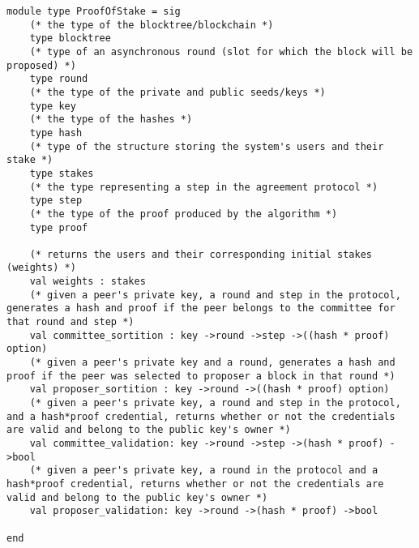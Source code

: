 \begin{lstlisting}
module type ProofOfStake = sig
    (* the type of the blocktree/blockchain *)
    type blocktree
    (* type of an asynchronous round (slot for which the block will be proposed) *)
    type round
    (* the type of the private and public seeds/keys *)
    type key
    (* the type of the hashes *)
    type hash
    (* type of the structure storing the system's users and their stake *)
    type stakes
    (* the type representing a step in the agreement protocol *)
    type step
    (* the type of the proof produced by the algorithm *)
    type proof
  
    (* returns the users and their corresponding initial stakes (weights) *)
    val weights : stakes
    (* given a peer's private key, a round and step in the protocol, generates a hash and proof if the peer belongs to the committee for that round and step *)
    val committee_sortition : key ->round ->step ->((hash * proof) option)
    (* given a peer's private key and a round, generates a hash and proof if the peer was selected to proposer a block in that round *)
    val proposer_sortition : key ->round ->((hash * proof) option)
    (* given a peer's private key, a round and step in the protocol, and a hash*proof credential, returns whether or not the credentials are valid and belong to the public key's owner *)
    val committee_validation: key ->round ->step ->(hash * proof) ->bool
    (* given a peer's private key, a round in the protocol and a hash*proof credential, returns whether or not the credentials are valid and belong to the public key's owner *)
    val proposer_validation: key ->round ->(hash * proof) ->bool
  
end
\end{lstlisting}